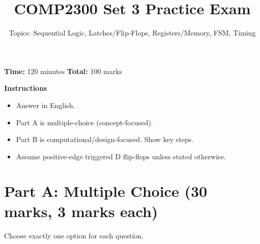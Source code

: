\documentclass[11pt]{article}
\title{COMP2300 Set 3 Practice Exam}
\author{Topics: Sequential Logic, Latches/Flip-Flops, Registers/Memory, FSM, Timing}
\date{}
\begin{document}
\maketitle

\noindent\textbf{Time:} 120 minutes \hfill
\textbf{Total:} 100 marks

\vspace{0.5em}
\noindent\textbf{Instructions}
\begin{itemize}[leftmargin=1.5em]
  \item Answer in English.
  \item Part A is multiple-choice (concept-focused).
  \item Part B is computational/design-focused. Show key steps.
  \item Assume positive-edge triggered D flip-flops unless stated otherwise.
\end{itemize}

\section*{Part A: Multiple Choice (30 marks, 3 marks each)}
Choose exactly one option for each question.
\end{document}
